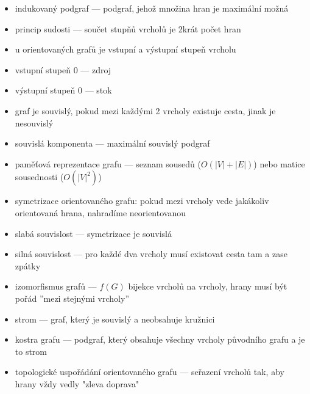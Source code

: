 \begin{itemize}
	\item indukovaný podgraf --- podgraf, jehož množina hran je maximální možná
	\item princip sudosti --- součet stupňů vrcholů je 2krát počet hran
	\item u orientovaných grafů je vstupní a výstupní stupeň vrcholu
	\item vstupní stupeň 0 --- zdroj
	\item výstupní stupeň 0 --- stok
	\item graf je souvislý, pokud mezi každými 2 vrcholy existuje cesta, jinak je nesouvislý
	\item souvislá komponenta --- maximální souvislý podgraf
	\item paměťová reprezentace grafu --- seznam sousedů ($O(|V| + |E|)$) nebo matice sousednosti ($O(|V|^2)$)
	\item symetrizace orientovaného grafu: pokud mezi vrcholy vede jakákoliv orientovaná hrana, nahradíme neorientovanou
	\item slabá souvislost --- symetrizace je souvislá
	\item silná souvislost --- pro každé dva vrcholy musí existovat cesta tam a zase zpátky 
	\item izomorfismus grafů --- $f(G)$ bijekce vrcholů na vrcholy, hrany musí být pořád ''mezi stejnými vrcholy''
	\item strom --- graf, který je souvislý a neobsahuje kružnici
	\item kostra grafu --- podgraf, který obsahuje všechny vrcholy původního grafu a je to strom
	\item topologické uspořádání orientovaného grafu --- seřazení vrcholů tak, aby hrany vždy vedly "zleva doprava" 
\end{itemize}

